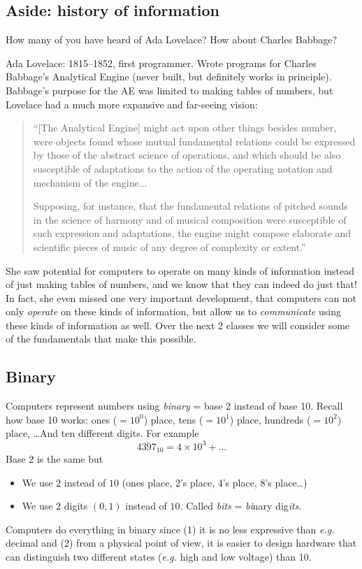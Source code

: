 \documentclass{article}
\newcommand{\eg}{\emph{e.g.}\xspace}
\begin{document}
\subsection*{Aside: history of information}

How many of you have heard of Ada Lovelace?  How about Charles
Babbage?

Ada Lovelace: 1815--1852, first programmer.  Wrote
programs for Charles Babbage's Analytical Engine (never built, but
definitely works in principle).  Babbage's purpose for the AE was
limited to making tables of numbers, but Lovelace had a much more
expansive and far-seeing vision:

\begin{quote}
``[The Analytical Engine] might act upon other things besides number,
were objects found whose mutual fundamental relations could be
expressed by those of the abstract science of operations, and which
should be also susceptible of adaptations to the action of the
operating notation and mechanism of the engine...

Supposing, for instance, that the fundamental relations of pitched
sounds in the science of harmony and of musical composition were
susceptible of such expression and adaptations, the engine might
compose elaborate and scientific pieces of music of any degree of
complexity or extent.''
\end{quote}

She saw potential for computers to operate on many kinds of
information instead of just making tables of numbers, and we know that
they can indeed do just that!  In fact, she even missed one very
important development, that computers can not only \emph{operate} on
these kinds of information, but allow us to \emph{communicate} using
these kinds of information as well.  Over the next 2 classes we will
consider some of the fundamentals that make this possible.

\subsection*{Binary}

Computers represent numbers using \emph{binary} = base 2 instead of
base 10.  Recall how base 10 works: ones ($=10^0$) place, tens
($=10^1$) place, hundreds ($=10^2$) place, \dots  And ten different
digits.  For example \[ 4397_{10} = 4 \times 10^3 + \dots \] Base 2 is
the same but
\begin{itemize}
\item We use $2$ instead of $10$ (ones place, 2's place, 4's place,
  8's place\dots)
\item We use $2$ digits $(0,1)$ instead of $10$.  Called \emph{bits} =
  \emph{bi}nary dig\emph{its}.
\end{itemize}
Computers do everything in binary since (1) it is no less expressive
than \eg decimal and (2) from a physical point of view, it is easier
to design hardware that can distinguish two different states
(\eg high and low voltage) than 10.
\end{document}
